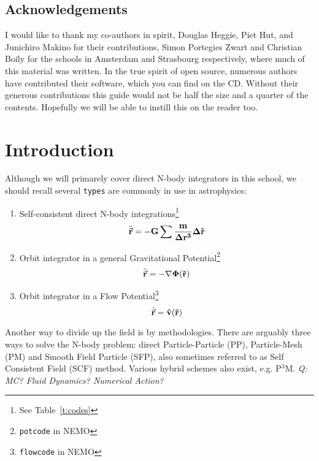 \section*{Acknowledgements}

I would like to thank my co-authors in spirit, 
Douglas Heggie, Piet Hut, and Junichiro Makino for their contributions, 
Simon Portegies Zwart and Christian Boily for the schools in Amsterdam 
and Strasbourg respectively, where much of this material was written.
In the true spirit of open source, 
numerous authors have contributed their software, which you can find on
the CD. Without their generous contributions this guide would not be
half the size and a quarter of the contents.
Hopefully we will be able to instill this on the reader too.



\chapter                {Introduction}

Although we will primarely cover direct N-body integrators in this school,
we should recall several {\tt types} are commonly in use
in astrophysics:

\begin{enumerate}
\item
Self-consistent direct N-body integrations\footnote{See Table~\ref{t:codes}}
\begin{equation}
    \ddot{\vec{\bf r}} = -G \sum{ {m\over{\Delta r^3}} \Delta \vec{\bf r}}
\end{equation}

\item
Orbit integrator in a general Gravitational Potential\footnote{{\tt potcode} in NEMO}
\begin{equation}
    \ddot{\vec{\bf r}} = -\nabla \Phi(\vec{\bf r})
\end{equation}

\item
Orbit integrator in a Flow Potential\footnote{{\tt flowcode} in NEMO}
\begin{equation}
    \dot{\vec{\bf r}} = \vec{\bf v}(\vec{\bf r})
\end{equation}


\end{enumerate}

Another way to divide up the field is by methodologies. There are arguably
three ways to solve the N-body problem: direct Particle-Particle (PP),
Particle-Mesh (PM) and Smooth Field Particle (SFP), also sometimes 
referred to as Self Consistent Field (SCF) method. Various hybrid schemes
also exist, e.g. P$^3$M.
\smallskip
{\it Q: MC? Fluid Dynamics? Numerical Action?}

